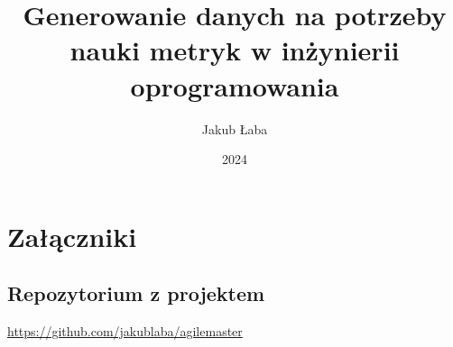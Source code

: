 \documentclass[thesis=inz,faculty=ee,oneside]{EE-dyplom}
\title{Generowanie danych na potrzeby nauki metryk w inżynierii oprogramowania}
\author{Jakub Łaba}
\date{2024}
\begin{document}
    \frontpages

    

    \bibliografia

    
    \appendix
    \chapter*{Załączniki}
    \section*{Repozytorium z projektem}
    \url{https://github.com/jakublaba/agilemaster}
\end{document}

